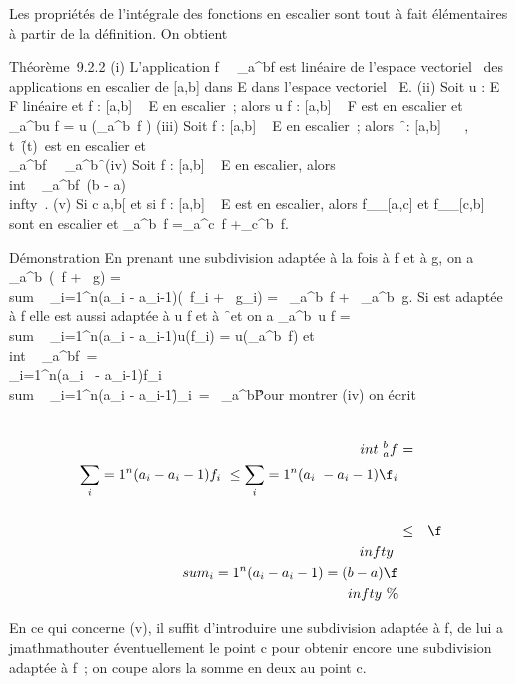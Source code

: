 \documentclass[]{article}
\begin{document}
Les propriétés de l'intégrale des fonctions en escalier sont tout à fait
élémentaires à partir de la définition. On obtient

Théorème~9.2.2 (i) L'application
f\mapsto~\int ~
_a^bf est linéaire de l'espace vectoriel ~des applications
en escalier de {[}a,b{]} dans E dans l'espace vectoriel ~E. (ii) Soit u
: E \rightarrow~ F linéaire et f : {[}a,b{]} \rightarrow~ E en escalier~; alors u \cdot f :
{[}a,b{]} \rightarrow~ F est en escalier et \int ~
_a^bu \cdot f = u\left
(\int  _a^b~f\right
) (iii) Soit f : {[}a,b{]} \rightarrow~ E en escalier~; alors
\f\ : {[}a,b{]} \rightarrow~ ~,
t\mapsto~\f(t)\
est en escalier et \\\int
 _a^bf\
\leq\int ~
_a^b\f\
(iv) Soit f : {[}a,b{]} \rightarrow~ E en escalier, alors
\\int ~
_a^bf\ \leq (b -
a)\f\\infty~. (v) Si c
\in{]}a,b{[} et si f : {[}a,b{]} \rightarrow~ E est en escalier, alors
f__{[}a,c{]} et
f__{[}c,b{]} sont en escalier et
\int  _a^b~f
=\int  _a^c~f
+\int  _c^b~f.

Démonstration En prenant une subdivision adaptée à la fois à f et à g,
on a \int  _a^b~(\alpha~f + \beta~g)
= \\sum ~
_i=1^n(a_i - a_i-1)(\alpha~f_i +
\beta~g_i) = \alpha~\int  _a^b~f +
\beta~\int  _a^b~g. Si \sigma est adaptée à
f elle est aussi adaptée à u \cdot f et à
\f\ et on a
\int  _a^b~u \cdot f
= \\sum ~
_i=1^n(a_i - a_i-1)u(f_i) =
u(\int  _a^b~f) et
\\int ~
_a^bf\
=\\
\sum  _i=1^n(a_i~ -
a_i-1)f_i\
\leq\\sum ~
_i=1^n(a_i -
a_i-1)\f_i\
=\int ~
_a^b\f\.
Pour montrer (iv) on écrit

\begin{align*}
\\int ~
_a^bf& =&
\\\sum
_i=1^n(a_ i -
a_i-1)f_i\
\leq\sum _i=1^n(a_ i~ -
a_i-1)\f_i\\%
\\ & \leq&
\f\\infty~\\sum
_i=1^n(a_ i - a_i-1) = (b -
a)\f\\infty~ \%&
\\ \end{align*}

En ce qui concerne (v), il suffit d'introduire une subdivision \sigma adaptée
à f, de lui a\\jmathmathouter éventuellement le point c pour obtenir encore une
subdivision adaptée à f~; on coupe alors la somme en deux au point c.
\end{document}
